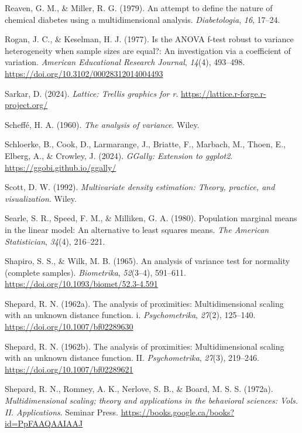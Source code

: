 \documentclass[
  letterpaper,
  10pt,
  krantz2]{krantz}
\newlength{\cslhangindent}
\newenvironment{CSLReferences}[2] %
 {\begin{list}{}{%
  \setlength{\itemindent}{0pt}
  \setlength{\leftmargin}{0pt}
  \setlength{\parsep}{0pt}
  \ifodd #1
   \setlength{\leftmargin}{\cslhangindent}
   \setlength{\itemindent}{-1\cslhangindent}
  \fi
  \setlength{\itemsep}{#2\baselineskip}}}
 {\end{list}}
\begin{document}
\begin{CSLReferences}{1}{0}
Reaven, G. M., \& Miller, R. G. (1979). An attempt to define the nature
of chemical diabetes using a multidimensional analysis.
\emph{Diabetologia}, \emph{16}, 17--24.

Rogan, J. C., \& Keselman, H. J. (1977). Is the {ANOVA} f-test robust to
variance heterogeneity when sample sizes are equal?: An investigation
via a coefficient of variation. \emph{American Educational Research
Journal}, \emph{14}(4), 493--498.
\url{https://doi.org/10.3102/00028312014004493}

Sarkar, D. (2024). \emph{Lattice: Trellis graphics for r}.
\url{https://lattice.r-forge.r-project.org/}

Scheffé, H. A. (1960). \emph{The analysis of variance}. Wiley.

Schloerke, B., Cook, D., Larmarange, J., Briatte, F., Marbach, M.,
Thoen, E., Elberg, A., \& Crowley, J. (2024). \emph{GGally: Extension to
ggplot2}. \url{https://ggobi.github.io/ggally/}

Scott, D. W. (1992). \emph{Multivariate density estimation: Theory,
practice, and visualization}. Wiley.

Searle, S. R., Speed, F. M., \& Milliken, G. A. (1980). Population
marginal means in the linear model: An alternative to least squares
means. \emph{The American Statistician}, \emph{34}(4), 216--221.

Shapiro, S. S., \& Wilk, M. B. (1965). An analysis of variance test for
normality (complete samples). \emph{Biometrika}, \emph{52}(3--4),
591--611. \url{https://doi.org/10.1093/biomet/52.3-4.591}

Shepard, R. N. (1962a). The analysis of proximities: Multidimensional
scaling with an unknown distance function. i. \emph{Psychometrika},
\emph{27}(2), 125--140. \url{https://doi.org/10.1007/bf02289630}

Shepard, R. N. (1962b). The analysis of proximities: Multidimensional
scaling with an unknown distance function. II. \emph{Psychometrika},
\emph{27}(3), 219--246. \url{https://doi.org/10.1007/bf02289621}

Shepard, R. N., Romney, A. K., Nerlove, S. B., \& Board, M. S. S.
(1972a). \emph{Multidimensional scaling; theory and applications in the
behavioral sciences: Vols. II. Applications}. Seminar Press.
\url{https://books.google.ca/books?id=PpFAAQAAIAAJ}


\end{CSLReferences}
\end{document}
